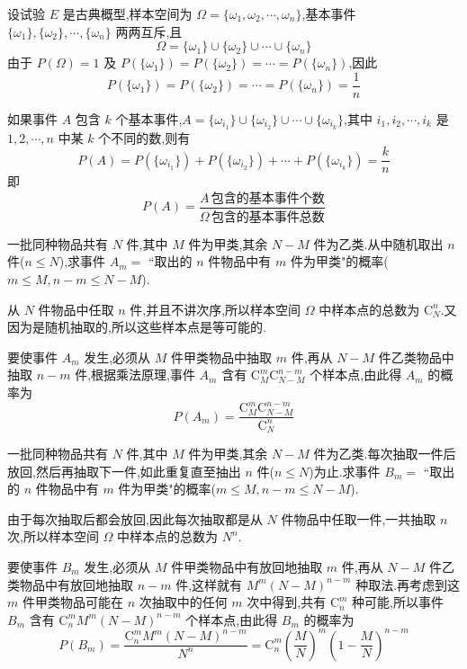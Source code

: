 设试验 $E$ 是古典概型,样本空间为 $\varOmega = \{\omega_1,\omega_2,\cdots,\omega_n\}$,基本事件 $\{\omega_1\},\{\omega_2\},\cdots,\{\omega_n\}$ 两两互斥,且
$$
\varOmega = \{\omega_1\} \cup \{\omega_2\} \cup \cdots \cup \{\omega_n\}
$$
由于 $P(\varOmega)=1$ 及 $P(\{\omega_1\})=P(\{\omega_2\})=\cdots=P(\{\omega_n\})$,因此
$$
P(\{\omega_1\})=P(\{\omega_2\})=\cdots=P(\{\omega_n\})=\dfrac{1}{n}
$$

如果事件 $A$ 包含 $k$ 个基本事件,$A=\{\omega_{i_1}\} \cup \{\omega_{i_2}\} \cup \cdots \cup \{\omega_{i_k}\}$,其中 $i_1,i_2,\cdots,i_k$ 是 $1,2,\cdots,n$ 中某 $k$ 个不同的数,则有
$$
P(A) = P(\{\omega_{i_1}\}) + P(\{\omega_{i_2}\}) + \cdots + P(\{\omega_{i_k}\}) = \dfrac{k}{n}
$$
即
$$
P(A)=\dfrac{A\,\text{包含的基本事件个数}}{\varOmega\,\text{包含的基本事件总数}}
$$

\begin{example}[][不放回抽样]
    \indent 一批同种物品共有 $N$ 件,其中 $M$ 件为甲类,其余 $N-M$ 件为乙类.从中随机取出 $n$ 件($n \leqslant N$),求事件 $A_m=$ ``取出的 $n$ 件物品中有 $m$ 件为甲类"的概率($m \leqslant M, n-m \leqslant N-M$).
\end{example}

\begin{solution}
    从 $N$ 件物品中任取 $n$ 件,并且不讲次序,所以样本空间 $\varOmega$ 中样本点的总数为 $\mathrm{C}_N^n$.又因为是随机抽取的,所以这些样本点是等可能的.

    要使事件 $A_m$ 发生,必须从 $M$ 件甲类物品中抽取 $m$ 件,再从 $N-M$ 件乙类物品中抽取 $n-m$ 件,根据乘法原理,事件 $A_m$ 含有 $\mathrm{C}_M^m \mathrm{C}_{N-M}^{n-m}$ 个样本点,由此得 $A_m$ 的概率为
    $$
    P(A_m) = \dfrac{\mathrm{C}_M^m \mathrm{C}_{N-M}^{n-m}}{\mathrm{C}_N^n}
    $$
\end{solution}

\begin{example}[][放回抽样]
    \indent 一批同种物品共有 $N$ 件,其中 $M$ 件为甲类,其余 $N-M$ 件为乙类.每次抽取一件后放回,然后再抽取下一件,如此重复直至抽出 $n$ 件($n \leqslant N$)为止.求事件 $B_m=$ ``取出的 $n$ 件物品中有 $m$ 件为甲类"的概率($m \leqslant M, n-m \leqslant N-M$).
\end{example}

\begin{solution}
    由于每次抽取后都会放回,因此每次抽取都是从 $N$ 件物品中任取一件,一共抽取 $n$ 次,所以样本空间 $\varOmega$ 中样本点的总数为 $N^n$.

    要使事件 $B_m$ 发生,必须从 $M$ 件甲类物品中有放回地抽取 $m$ 件,再从 $N-M$ 件乙类物品中有放回地抽取 $n-m$ 件,这样就有 $M^m (N-M)^{n-m}$ 种取法.再考虑到这 $m$ 件甲类物品可能在 $n$ 次抽取中的任何 $m$ 次中得到,共有 $\mathrm{C}_n^m$ 种可能,所以事件 $B_m$ 含有 $\mathrm{C}_n^m M^m (N-M)^{n-m}$ 个样本点,由此得 $B_m$ 的概率为
    $$
    P(B_m) = \dfrac{\mathrm{C}_n^m M^m (N-M)^{n-m}}{N^n} = \mathrm{C}_n^m \left( \dfrac{M}{N} \right)^m \left( 1 - \dfrac{M}{N} \right)^{n-m}
    $$
\end{solution}

